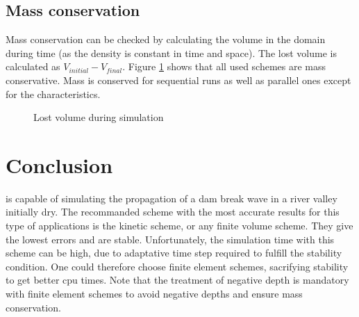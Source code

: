 \subsection{Mass conservation}

Mass conservation can be checked by calculating the volume in the domain during time (as the density is constant in time and space). The lost volume is calculated as $V_{initial} - V_{final}$.
Figure \ref{fig:malpasset:lostvol} shows that all used schemes are mass conservative. Mass is conserved for sequential runs as well as parallel ones except for the characteristics. 

\begin{figure}[H]
\centering
{}
\caption{Lost volume during simulation}
\label{fig:malpasset:lostvol}
\end{figure}

\section{Conclusion}
 is capable of simulating the propagation of a dam break wave in a river valley initially dry.
The recommanded scheme with the most accurate results for this type of applications is the kinetic scheme,
or any finite volume scheme. They give the lowest errors and are stable.
Unfortunately, the simulation time with this scheme can be high, due to adaptative time step required to
fulfill the stability condition.
One could therefore choose finite element schemes, sacrifying stability to get better cpu times.
Note that the treatment of negative depth is mandatory with finite element schemes to avoid negative depths and ensure mass conservation.
